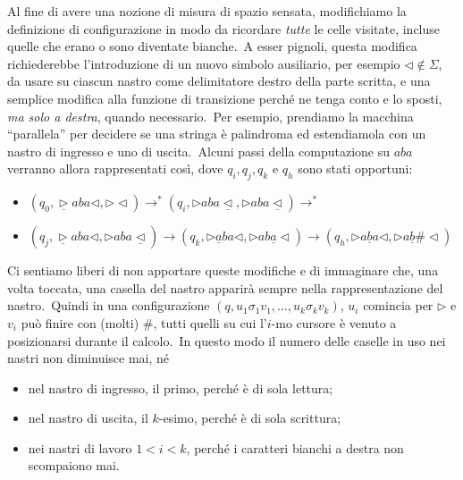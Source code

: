 Al fine di avere una nozione di misura di spazio sensata, modifichiamo la definizione di configurazione in modo da ricordare \textit{tutte} le celle visitate, incluse quelle che erano o sono diventate bianche.\
A esser pignoli, questa modifica richiederebbe l'introduzione di un nuovo simbolo ausiliario, per esempio $\triangleleft \notin \Sigma$, da usare su ciascun nastro come delimitatore destro della parte scritta, e una semplice modifica alla funzione di transizione perché ne tenga conto e lo sposti, \textit{ma solo a destra}, quando necessario.\
Per esempio, prendiamo la macchina ``parallela'' per decidere se una stringa è palindroma ed estendiamola con un nastro di ingresso e uno di uscita.\
Alcuni passi della computazione su $aba$ verranno allora rappresentati così, dove $q_i, q_j , q_k$ e $q_h$ sono stati opportuni:
\begin{itemize}
    \itemsep0px
    \item[] $(q_0, \underline{\triangleright} aba \triangleleft, \triangleright \triangleleft) \rightarrow^* (q_i, \triangleright aba \underline{\triangleleft}, \triangleright aba \underline{\triangleleft}) \rightarrow^*$
    \item[] $(q_j, \underline{\triangleright} aba \triangleleft, \triangleright aba \underline{\triangleleft}) \rightarrow (q_k, \triangleright \underline{a}ba \triangleleft, \triangleright ab\underline{a} \triangleleft) \rightarrow (q_h, \triangleright a\underline{b}a \triangleleft, \triangleright a\underline{b}\# \triangleleft)$
\end{itemize}

\noindent Ci sentiamo liberi di non apportare queste modifiche e di immaginare che, una volta toccata, una casella del nastro apparirà sempre nella rappresentazione del nastro.\
Quindi in una configurazione $(q, u_1 \sigma_1 v_1 , \dots, u_k \sigma_k v_k )$, $u_i$ comincia per $\triangleright$ e $v_i$ può finire con (molti) \#, tutti quelli su cui l'$i$-mo cursore è venuto a posizionarsi durante il calcolo.\
In questo modo il numero delle caselle in uso nei nastri non diminuisce mai, né

\begin{itemize}
    \item nel nastro di ingresso, il primo, perché è di sola lettura;
    \item nel nastro di uscita, il $k$-esimo, perché è di sola scrittura;
    \item nei nastri di lavoro $1 < i < k$, perché i caratteri bianchi a destra non scompaiono mai.
\end{itemize}

